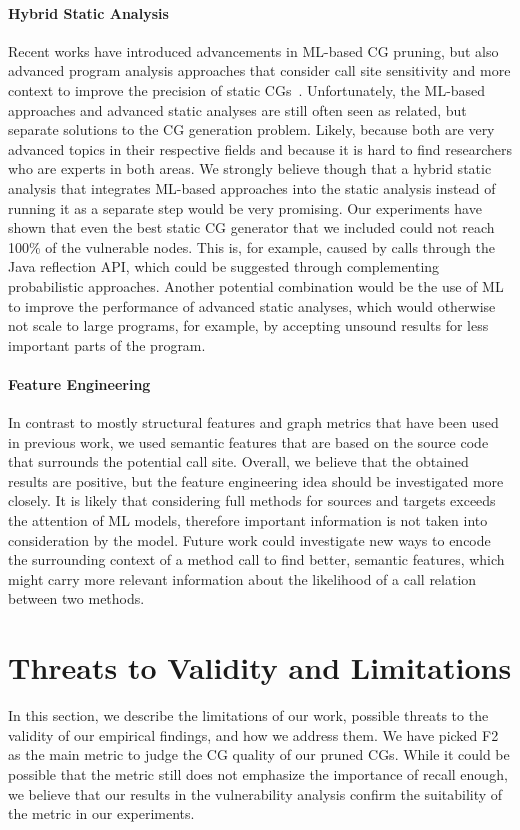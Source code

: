 \paragraph{Hybrid Static Analysis}
Recent works have introduced advancements in ML-based CG pruning, but also advanced program analysis approaches that consider call site sensitivity and more context to improve the precision of static CGs~\cite{ma2023context, jeon2022return}.
Unfortunately, the ML-based approaches and advanced static analyses are still often seen as related, but separate solutions to the CG generation problem.
Likely, because both are very advanced topics in their respective fields and because it is hard to find researchers who are experts in both areas.
We strongly believe though that a hybrid static analysis that integrates ML-based approaches into the static analysis instead of running it as a separate step would be very promising.
Our experiments have shown that even the best static CG generator that we included could not reach 100\% of the vulnerable nodes.
This is, for example, caused by calls through the Java reflection API, which could be suggested through complementing probabilistic approaches.
Another potential combination would be the use of ML to improve the performance of advanced static analyses, which would otherwise not scale to large programs, for example, by accepting unsound results for less important parts of the program.

\paragraph{Feature Engineering}
In contrast to mostly structural features and graph metrics that have been used in previous work, we used semantic features that are based on the source code that surrounds the potential call site.
Overall, we believe that the obtained results are positive, but the feature engineering idea should be investigated more closely.
It is likely that considering full methods for sources and targets exceeds the attention of ML models, therefore important information is not taken into consideration by the model.
Future work could investigate new ways to encode the surrounding context of a method call to find better, semantic features, which might carry more relevant information about the likelihood of a call relation between two methods.

\section{Threats to Validity and Limitations}\label{ch1:sec:ttv}
In this section, we describe the limitations of our work, possible threats to the validity of our empirical findings, and how we address them. We have picked F2 as the main metric to judge the CG quality of our pruned CGs. While it could be possible that the metric still does not emphasize the importance of recall enough, we believe that our results in the vulnerability analysis confirm the suitability of the metric in our experiments.

